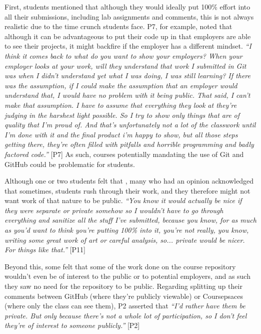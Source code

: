 First, students mentioned that although they would ideally put 100\% effort into all their submissions, including lab assignments and comments, this is not always realistic due to the time crunch students face. P7, for example, noted that although it can be advantageous to put their code up in that employers are able to see their projects, it might backfire if the employer has a different mindset. \textit{``I think it comes back to what do you want to show your employers? When your employer looks at your work, will they understand that work I submitted in Git was when I didn't understand yet what I was doing, I was still learning? If there was the assumption, if I could make the assumption that an employer would understand that, I would have no problem with it being public. That said, I can't make that assumption. I have to assume that everything they look at they're judging in the harshest light possible. So I try to show only things that are of quality that I'm proud of. And that's unfortunately not a lot of the classwork until I'm done with it and the final product i'm happy to show, but all those steps getting there, they're often filled with pitfalls and horrible programming and badly factored code.''} [P7] As such, courses potentially mandating the use of Git and GitHub could be problematic for students.

Although one or two students felt that %
, many who had an opinion acknowledged that sometimes, students rush through their work, and they therefore might not want work of that nature to be public. \textit{``You know it would actually be nice if they were separate or private somehow so I wouldn't have to go through everything and sanitize all the stuff I've submitted, because you know, for as much as you'd want to think you're putting 100\% into it, you're not really, you know, writing some great work of art or careful analysis, so... private would be nicer. For things like that.''} [P11]

Beyond this, some felt that some of the work done on the course repository wouldn't even be of interest to the public or to potential employers, and as such they saw no need for the repository to be public. Regarding splitting up their comments between GitHub (where they're publicly viewable) or Coursepsaces (where only the class can see them), P2 asserted that \textit{``I'd rather have them be private. But only because there's not a whole lot of participation, so I don't feel they're of interest to someone publicly.''} [P2]

